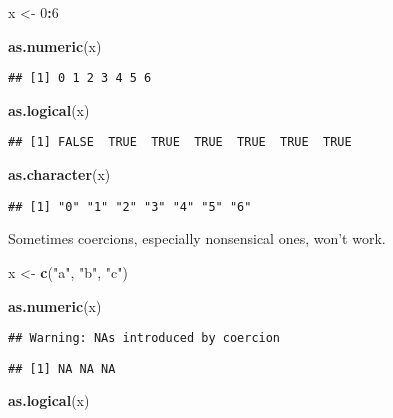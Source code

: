 \documentclass[
]{book}
\newenvironment{Shaded}{\begin{snugshade}}{\end{snugshade}}
\newcommand{\DecValTok}[1]{\textcolor[rgb]{0.00,0.00,0.81}{#1}}
\newcommand{\KeywordTok}[1]{\textcolor[rgb]{0.13,0.29,0.53}{\textbf{#1}}}
\newcommand{\NormalTok}[1]{#1}
\newcommand{\OperatorTok}[1]{\textcolor[rgb]{0.81,0.36,0.00}{\textbf{#1}}}
\newcommand{\StringTok}[1]{\textcolor[rgb]{0.31,0.60,0.02}{#1}}
\begin{document}
\begin{Shaded}
\begin{Highlighting}[]
\NormalTok{x \textless{}{-}}\StringTok{ }\DecValTok{0}\OperatorTok{:}\DecValTok{6}

\KeywordTok{as.numeric}\NormalTok{(x)}
\end{Highlighting}
\end{Shaded}

\begin{verbatim}
## [1] 0 1 2 3 4 5 6
\end{verbatim}

\begin{Shaded}
\begin{Highlighting}[]
\KeywordTok{as.logical}\NormalTok{(x)}
\end{Highlighting}
\end{Shaded}

\begin{verbatim}
## [1] FALSE  TRUE  TRUE  TRUE  TRUE  TRUE  TRUE
\end{verbatim}

\begin{Shaded}
\begin{Highlighting}[]
\KeywordTok{as.character}\NormalTok{(x)}
\end{Highlighting}
\end{Shaded}

\begin{verbatim}
## [1] "0" "1" "2" "3" "4" "5" "6"
\end{verbatim}

Sometimes coercions, especially nonsensical ones, won't work.

\begin{Shaded}
\begin{Highlighting}[]
\NormalTok{x \textless{}{-}}\StringTok{ }\KeywordTok{c}\NormalTok{(}\StringTok{"a"}\NormalTok{, }\StringTok{"b"}\NormalTok{, }\StringTok{"c"}\NormalTok{)}

\KeywordTok{as.numeric}\NormalTok{(x)}
\end{Highlighting}
\end{Shaded}

\begin{verbatim}
## Warning: NAs introduced by coercion
\end{verbatim}

\begin{verbatim}
## [1] NA NA NA
\end{verbatim}

\begin{Shaded}
\begin{Highlighting}[]
\KeywordTok{as.logical}\NormalTok{(x)}
\end{Highlighting}
\end{Shaded}
\end{document}

